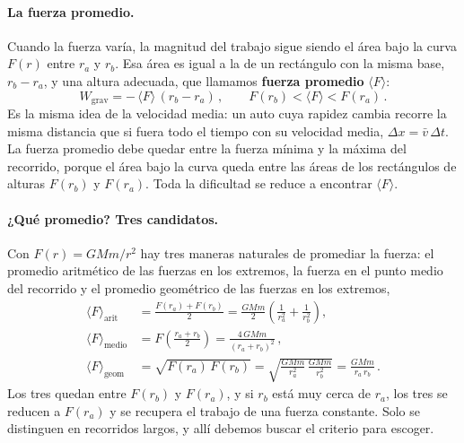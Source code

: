 \documentclass[11pt,a4paper]{book}
\begin{document}
\paragraph{La fuerza promedio.}
Cuando la fuerza varía, la magnitud del trabajo sigue siendo el área bajo la
curva $F(r)$ entre $r_{a}$ y $r_{b}$. Esa área es igual a la de un
rectángulo con la misma base, $r_{b} - r_{a}$, y una altura adecuada, que
llamamos \textbf{fuerza promedio} $\langle F\rangle$:
\begin{equation}
  W_{\text{grav}} = -\,\langle F\rangle\,(r_{b} - r_{a}) \,,
  \qquad
  F(r_{b}) < \langle F\rangle < F(r_{a}) \,.
  \label{eq:trabajo_fuerza_promedio}
\end{equation}
Es la misma idea de la velocidad media: un auto cuya rapidez cambia recorre la
misma distancia que si fuera todo el tiempo con su velocidad media,
$\Delta x = \bar{v}\,\Delta t$. La fuerza promedio debe quedar entre la
fuerza mínima y la máxima del recorrido, porque el área bajo la curva queda
entre las áreas de los rectángulos de alturas $F(r_{b})$ y $F(r_{a})$. Toda
la dificultad se reduce a encontrar $\langle F\rangle$.

\paragraph{¿Qué promedio? Tres candidatos.}
Con $F(r) = GMm/r^{2}$ hay tres maneras naturales de promediar la fuerza: el
promedio aritmético de las fuerzas en los extremos, la fuerza en el punto
medio del recorrido y el promedio geométrico de las fuerzas en los extremos,
\begin{align}
  \langle F\rangle_{\text{arit}}
  &= \frac{F(r_{a}) + F(r_{b})}{2}
   = \frac{GMm}{2}\left(\frac{1}{r_{a}^{2}} + \frac{1}{r_{b}^{2}}\right) ,
  \label{eq:promedio_aritmetico}\\
  \langle F\rangle_{\text{medio}}
  &= F\!\left(\frac{r_{a} + r_{b}}{2}\right)
   = \frac{4\,GMm}{(r_{a} + r_{b})^{2}} \,,
  \label{eq:promedio_punto_medio}\\
  \langle F\rangle_{\text{geom}}
  &= \sqrt{F(r_{a})\,F(r_{b})}
   = \sqrt{\frac{GMm}{r_{a}^{2}}\,\frac{GMm}{r_{b}^{2}}}
   = \frac{GMm}{r_{a}\,r_{b}} \,.
  \label{eq:promedio_geometrico}
\end{align}
Los tres quedan entre $F(r_{b})$ y $F(r_{a})$, y si $r_{b}$ está muy cerca de
$r_{a}$, los tres se reducen a $F(r_{a})$ y se recupera el trabajo de una
fuerza constante. Solo se distinguen en recorridos largos, y allí debemos
buscar el criterio para escoger.
\end{document}
